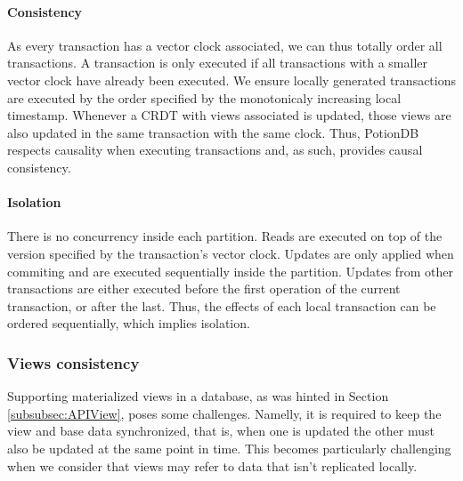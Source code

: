 \documentclass{vldb}
\begin{document}
\paragraph{Consistency} As every transaction has a vector clock associated, we can thus totally order all transactions. 
A transaction is only executed if all transactions with a smaller vector clock have already been executed. 
We ensure locally generated transactions are executed by the order specified by the monotonicaly increasing local timestamp.
Whenever a CRDT with views associated is updated, those views are also updated in the same transaction with the same clock.
Thus, PotionDB respects causality when executing transactions and, as such, provides causal consistency.

\paragraph{Isolation} %
There is no concurrency inside each partition.
Reads are executed on top of the version specified by the transaction's vector clock. %
Updates are only applied when commiting and are executed sequentially inside the partition.
Updates from other transactions are either executed before the first operation of the current transaction, or after the last.
Thus, the effects of each local transaction can be ordered sequentially, which implies isolation.


\subsubsection{Views consistency}

Supporting materialized views in a database, as was hinted in Section \ref{subsubsec:APIView}, poses some challenges.
Namelly, it is required to keep the view and base data synchronized, that is, when one is updated the other must also be updated at the same point in time.
This becomes particularly challenging when we consider that views may refer to data that isn't replicated locally.
\end{document}
